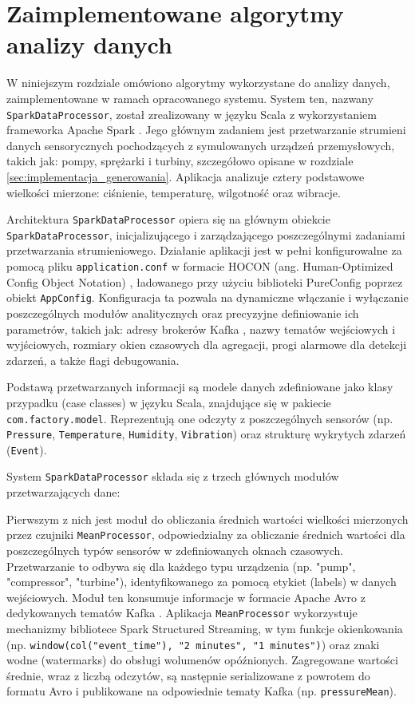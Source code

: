 \section{Zaimplementowane algorytmy analizy danych}
\label{sec:algorytmy_analizy}

W niniejszym rozdziale omówiono algorytmy wykorzystane do analizy danych, zaimplementowane w ramach opracowanego systemu. System ten, nazwany \texttt{SparkDataProcessor}, został zrealizowany w języku Scala z wykorzystaniem frameworka Apache Spark \cite{spark_streaming}. Jego głównym zadaniem jest przetwarzanie strumieni danych sensorycznych pochodzących z symulowanych urządzeń przemysłowych, takich jak: pompy, sprężarki i turbiny, szczegółowo opisane w rozdziale \ref{sec:implementacja_generowania}. Aplikacja analizuje cztery podstawowe wielkości mierzone: ciśnienie, temperaturę, wilgotność oraz wibracje.

Architektura \texttt{SparkDataProcessor} opiera się na głównym obiekcie \texttt{SparkDataProcessor}, inicjalizującego i zarządzającego poszczególnymi zadaniami przetwarzania strumieniowego. Działanie aplikacji jest w pełni konfigurowalne za pomocą pliku \texttt{application.conf} w formacie HOCON (ang. Human-Optimized Config Object Notation) \cite{hocon_spec}, ładowanego przy użyciu biblioteki PureConfig \cite{pureconfig_docs} poprzez obiekt \texttt{AppConfig}. Konfiguracja ta pozwala na dynamiczne włączanie i wyłączanie poszczególnych modułów analitycznych oraz precyzyjne definiowanie ich parametrów, takich jak: adresy brokerów Kafka \cite{kafka}, nazwy tematów wejściowych i wyjściowych, rozmiary okien czasowych dla agregacji, progi alarmowe dla detekcji zdarzeń, a także flagi debugowania.

Podstawą przetwarzanych informacji są modele danych zdefiniowane jako klasy przypadku (case classes) w języku Scala, znajdujące się w pakiecie \texttt{com.factory.model}. Reprezentują one odczyty z poszczególnych sensorów (np. \texttt{Pressure}, \texttt{Temperature}, \texttt{Humidity}, \texttt{Vibration}) oraz strukturę wykrytych zdarzeń (\texttt{Event}).

System \texttt{SparkDataProcessor} składa się z trzech głównych modułów przetwarzających dane:

Pierwszym z nich jest moduł do obliczania średnich wartości wielkości mierzonych przez czujniki \texttt{MeanProcessor}, odpowiedzialny za obliczanie średnich wartości dla poszczególnych typów sensorów w zdefiniowanych oknach czasowych. Przetwarzanie to odbywa się dla każdego typu urządzenia (np. "pump", "compressor", "turbine"), identyfikowanego za pomocą etykiet (labels) w danych wejściowych. Moduł ten konsumuje informacje w formacie Apache Avro \cite{avro_documentation} z dedykowanych tematów Kafka \cite{kafka}. Aplikacja \texttt{MeanProcessor} wykorzystuje mechanizmy bibliotece Spark Structured Streaming, w tym funkcje okienkowania (np. \texttt{window(col("event\_time"), "2 minutes", "1 minutes")}) oraz znaki wodne (watermarks) \cite{watermarking} do obsługi wolumenów opóźnionych. Zagregowane wartości średnie, wraz z liczbą odczytów, są następnie serializowane z powrotem do formatu Avro i publikowane na odpowiednie tematy Kafka (np. \texttt{pressureMean}).

